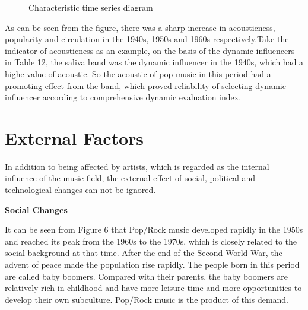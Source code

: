\documentclass{mcmthesis}
\begin{document}
\begin{figure}[H] %
	\centering  %
	\vspace{-0.35cm} %
	\subfigtopskip=2pt %
	\subfigbottomskip=2pt %
	\subfigcapskip=5pt %
	\quad %
	\subfigure[Loudness]{
		\label{level.sub.3}
		\texttt{[image: l]}}
	\quad
	\caption{Characteristic time series diagram}
	\label{level}
\end{figure}
As can be seen from the figure, there was a sharp increase in acousticness, popularity and circulation in the 1940s, 1950s and 1960s respectively.Take the  indicator of acousticness as an example, on the basis of the dynamic influencers in Table 12, the saliva band was the dynamic influencer in the 1940s, which had a highe value of acoustic. So the acoustic of pop music in this period had a promoting effect from the band, which proved reliability of selecting dynamic influencer according to comprehensive dynamic evaluation index.
 
 
\section{External Factors}
In addition to being affected by artists, which is regarded as the internal influence of the music field, the external effect of social, political and technological changes can not be ignored.

\noindent%
\textbf{Social Changes}

It can be seen from Figure 6 that Pop$/$Rock music developed rapidly in the 1950s and reached its peak from the 1960s to the 1970s, which is closely related to the social background at that time. After the end of the Second World War, the advent of peace made the population rise rapidly. The people born in this period are called baby boomers. Compared with their parents, the baby boomers are relatively rich in childhood and have more leisure time and more opportunities to develop their own subculture. Pop$/$Rock music is the product of this demand.
\end{document}
